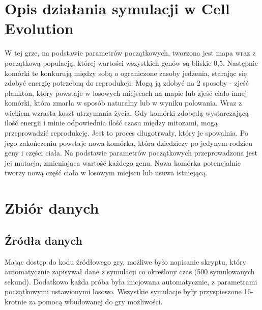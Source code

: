 \documentclass{article}
\begin{document}
\section{Opis działania symulacji w Cell Evolution}
W tej grze, na podstawie parametrów początkowych, tworzona jest mapa wraz z początkową populacją, której wartości wszystkich genów są bliskie 0,5. Następnie komórki te konkurują między sobą o ograniczone zasoby jedzenia, starając się zdobyć energię potrzebną do reprodukcji. Mogą ją zdobyć na 2 sposoby - zjeść plankton, który powstaje w losowych miejscach na mapie lub zjeść ciało innej komórki, która zmarła w sposób naturalny lub w wyniku polowania. Wraz z wiekiem wzrasta koszt utrzymania życia. Gdy komórki zdobędą wystarczającą ilość energii i minie odpowiednia ilość czasu między mitozami, mogą przeprowadzić reprodukcję. Jest to proces długotrwały, który je spowalnia. Po jego zakończeniu powstaje nowa komórka, która dziedziczy po jedynym rodzicu geny i części ciała. Na podstawie parametrów początkowych przeprowadzona jest jej mutacja, zmieniająca wartość każdego genu. Nowa komórka potencjalnie tworzy nową część ciała w losowym miejscu lub usuwa istniejącą.

\section{Zbiór danych}
\subsection{Źródła danych}
Mając dostęp do kodu źródłowego gry, możliwe było napisanie skryptu, który automatycznie zapisywał dane z symulacji co określony czas (500 symulowanych sekund). Dodatkowo każda próba była inicjowana automatycznie, z parametrami początkowymi ustawionymi losowo. Wszystkie symulacje były przyspieszone 16-krotnie za pomocą wbudowanej do gry możliwości. 
\end{document}
